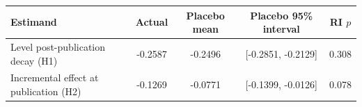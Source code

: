 \begin{tabular}{lcccc}
\toprule
Estimand & Actual & Placebo mean & Placebo 95\% interval & RI $p$ \\
\midrule
Level post-publication decay (H1) & -0.2587 & -0.2496 & [-0.2851, -0.2129] & 0.308 \\
Incremental effect at publication (H2) & -0.1269 & -0.0771 & [-0.1399, -0.0126] & 0.078 \\
\bottomrule
\end{tabular}